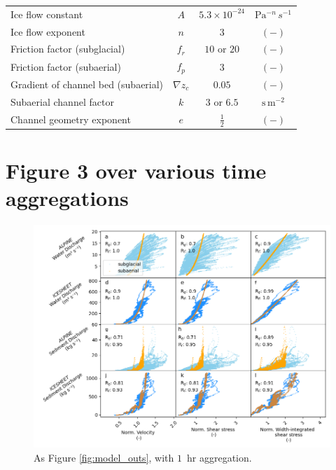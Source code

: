 \documentclass[draft]{agujournal2019}
\newcommand{\unit}[1]{$\mathrm{#1}$}
\begin{document}
\begin{table}[h]
\begin{tabular}{ l  c  c c }
    Ice flow constant &$A$& $5.3\times10^{-24}$ &\unit{Pa}$^{-n}$\,$s^{-1}$\\
    Ice flow exponent &$n$& $3$ &$\mathrm{(-)}$\\
    Friction factor (subglacial) & $f_r$ &$10$ or $20$ & $\mathrm{(-)}$ \\
    Friction factor (subaerial) & $f_p$ & $3$ & $\mathrm{(-)}$\\
    Gradient of channel bed (subaerial) &$\nabla z_c$ &$0.05$& $\mathrm{(-)}$\\
    Subaerial channel factor & $k$ &$3$ or $6.5$ & $\mathrm{s\,m^{-2}}$\\
    Channel geometry exponent &$e$& $\frac{1}{2}$&$\mathrm{(-)}$ \\
    \hline
  \end{tabular}
  \label{table:vpm}


\end{table}
\FloatBarrier

\section{Figure 3 over various time aggregations}

\begin{center}
  \begin{figure}[!h]
    \includegraphics[width=0.7\linewidth]{Fig3_hr.png}
    \caption{As Figure \ref{fig:model_outs}, with $1$ \,\unit{hr} aggregation.}
    \label{fig:model_outs_1hr}
  \end{figure}
\end{center}
\end{document}
